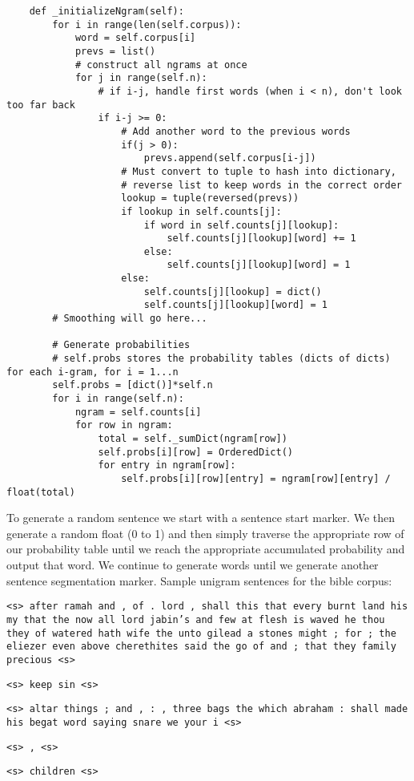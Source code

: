 \documentclass{article}
\begin{document}
{\small
\begin{verbatim}
    def _initializeNgram(self):
        for i in range(len(self.corpus)):
            word = self.corpus[i]
            prevs = list()
            # construct all ngrams at once
            for j in range(self.n):
                # if i-j, handle first words (when i < n), don't look too far back
                if i-j >= 0:
                    # Add another word to the previous words
                    if(j > 0):
                        prevs.append(self.corpus[i-j])
                    # Must convert to tuple to hash into dictionary,
                    # reverse list to keep words in the correct order
                    lookup = tuple(reversed(prevs))
                    if lookup in self.counts[j]:
                        if word in self.counts[j][lookup]:
                            self.counts[j][lookup][word] += 1
                        else:
                            self.counts[j][lookup][word] = 1
                    else:
                        self.counts[j][lookup] = dict()
                        self.counts[j][lookup][word] = 1
        # Smoothing will go here...

        # Generate probabilities
        # self.probs stores the probability tables (dicts of dicts) for each i-gram, for i = 1...n
        self.probs = [dict()]*self.n
        for i in range(self.n):
            ngram = self.counts[i]
            for row in ngram:
                total = self._sumDict(ngram[row])
                self.probs[i][row] = OrderedDict()
                for entry in ngram[row]:
                    self.probs[i][row][entry] = ngram[row][entry] / float(total)
\end{verbatim}}

\par To generate a random sentence we start with a sentence start marker. We then generate a random float (0 to 1)
and then simply traverse the appropriate row of our probability table until we reach the appropriate accumulated probability and output that word.
We continue to generate words until we generate another sentence segmentation marker.
\vspace{2mm}
\setlength{\parindent}{0cm}
\newcommand\npar{\par\smallskip}
Sample unigram sentences for the bible corpus:\npar
\texttt{<s> after ramah and , of . lord , shall this that every burnt land his my that the now all lord jabin's and few at flesh is waved he thou they of watered hath wife the unto gilead a stones might ; for ; the eliezer even above cherethites said the go of and ; that they family precious <s>}\npar
\texttt{<s> keep sin <s>}\npar
\texttt{<s> altar things ; and , : , three bags the which abraham : shall made his begat word saying snare we your i <s>}\npar
\texttt{<s> , <s>}\npar
\texttt{<s> children <s>}\npar
\bigskip
\end{document}
